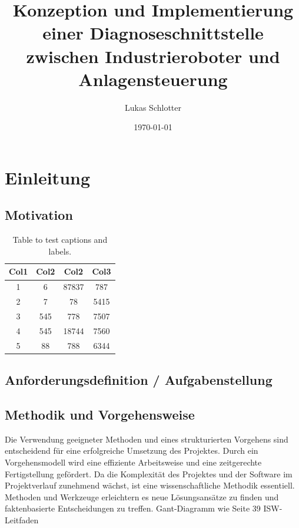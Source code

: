 \documentclass[ a4paper,
                oneside,
                toc=bibliography,
                toc=listof
                ]{scrbook}
\author{Lukas Schlotter}
\title{Konzeption und Implementierung einer Diagnoseschnittstelle zwischen Industrieroboter und Anlagensteuerung}
\date{\today}
\begin{document}
 
    \frontmatter
    \makeISWtitle
    
    \cleardoublepage
	\setcounter{page}{1} %

    
    \cleardoublepage
    \tableofcontents
    

    \mainmatter
    
    \chapter{Einleitung}

    \section{Motivation}
    

    
    \begin{table}[h!]
    	\centering
    	\begin{tabular}{||c c c c||} 
    		\hline
    		Col1 & Col2 & Col2 & Col3 \\ [0.5ex] 
    		\hline\hline
    		1 & 6 & 87837 & 787 \\ 
    		2 & 7 & 78 & 5415 \\
    		3 & 545 & 778 & 7507 \\
    		4 & 545 & 18744 & 7560 \\
    		5 & 88 & 788 & 6344 \\ [1ex] 
    		\hline
    	\end{tabular}
    	\caption{Table to test captions and labels.}
    	\label{table:1}
    \end{table}
	
	\section{Anforderungsdefinition / Aufgabenstellung}
	
	\section{Methodik und Vorgehensweise}
	Die Verwendung geeigneter Methoden und eines strukturierten Vorgehens sind entscheidend für eine erfolgreiche Umsetzung des Projektes. Durch ein Vorgehensmodell wird eine effiziente Arbeitsweise und eine zeitgerechte Fertigstellung gefördert. Da die Komplexität des Projektes und der Software im Projektverlauf zunehmend wächst, ist eine wissenschaftliche Methodik essentiell. Methoden und Werkzeuge erleichtern es neue Lösungsansätze zu finden und faktenbasierte Entscheidungen zu treffen. \cite{SoftwaretechnikBroy} \cite{ISWLeitfaden}
	Gant-Diagramm wie Seite 39 ISW-Leitfaden
\end{document}
